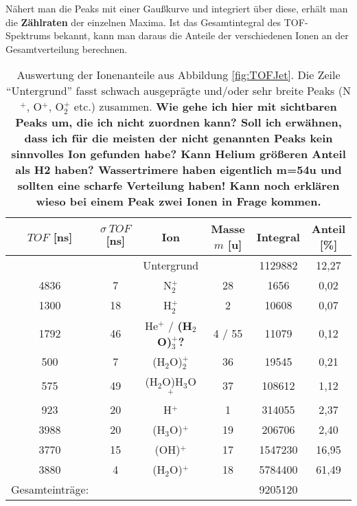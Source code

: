 Nähert man die Peaks mit einer Gaußkurve und integriert über diese, erhält man die \textbf{Zählraten} der einzelnen Maxima. Ist das Gesamtintegral des TOF-Spektrums bekannt, kann man daraus die Anteile der verschiedenen Ionen an der Gesamtverteilung berechnen.
%
\begin{center}
\begin{table}
\begin{tabular}{c c c c c c} \toprule
		 $TOF$ [ns] & $\sigma \ TOF$ [ns] & Ion & Masse $m$ [u] & Integral & Anteil [\%]\\\midrule
            &   & Untergrund & & 1129882 & 12,27\\
       4836 & 7  & N$_2^+$ & 28 & 1656 & 0,02 \\
       1300 & 18 & H$_2^+$ & 2 & 10608 & 0,07 \\
       1792 & 46 & He$^+$ / \textbf{(H$_2$O)$_3^+$?} & 4 / 55 & 11079 & 0,12 \\
       500 & 7 & (H$_2$O)$_2^+$ & 36 & 19545 & 0,21 \\
       575 & 49 & (H$_2$O)H$_3$O$^+$ & 37 & 108612 & 1,12 \\
       923 & 20 & H$^+$ & 1 & 314055 & 2,37 \\
       3988 & 20 & (H$_3$O)$^+$ & 19 & 206706 & 2,40 \\
       3770 & 15 & (OH)$^+$ & 17 & 1547230 & 16,95 \\
       3880 & 4 & (H$_2$O)$^+$ & 18 & 5784400 & 61,49 \\\bottomrule  
	  Gesamteinträge: & &&& 9205120 \\\bottomrule
	  
\end{tabular}
 \caption{Auswertung der Ionenanteile aus Abbildung \ref{fig:TOFJet}. Die Zeile \enquote{Untergrund} fasst schwach ausgeprägte und/oder sehr breite Peaks (N$^+$, O$^+$, O$_2^+$ etc.) zusammen. \textbf{Wie gehe ich hier mit sichtbaren Peaks um, die ich nicht zuordnen kann? Soll ich erwähnen, dass ich für die meisten der nicht genannten Peaks kein sinnvolles Ion gefunden habe? Kann Helium größeren Anteil als H2 haben? Wassertrimere haben eigentlich m=54u und sollten eine scharfe Verteilung haben! Kann noch erklären wieso bei einem Peak zwei Ionen in Frage kommen.}} \label{tab:Antile}
\end{table}
\end{center} 


